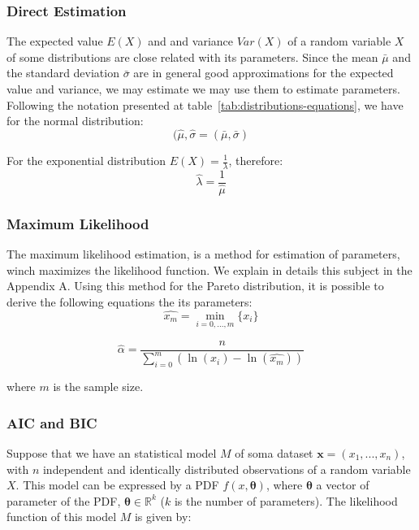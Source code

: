 \subsubsection{Direct Estimation}

The expected value $E(X)$ and and variance $Var(X)$ of a random variable $X$ of some distributions are close related with its parameters. Since the mean $\bar{\mu}$ and the standard deviation $\bar{\sigma}$ are in general good approximations for the expected value and variance, we may estimate we may use them to estimate parameters.
Following the notation presented at table~\ref{tab:distributions-equations}, we have for the normal distribution:
\begin{equation}
(\hat{\mu}, \hat{\sigma} = (\bar{\mu}, \bar{\sigma})
\end{equation}


For the exponential distribution $E(X) = \frac{1}{\lambda}$, therefore:
\begin{equation}
\hat{\lambda} = \frac{1}{\hat{\mu}}
\end{equation} 

\subsubsection{Maximum Likelihood}

The maximum likelihood estimation, is a method for estimation of parameters, winch maximizes the likelihood function. We explain in details this subject in the Appendix A. Using this method for the Pareto distribution, it is possible to derive the following equations the its parameters:
\begin{equation}
\hat{x_{m}} = \min_{i = 0, ..., m}\{x_{i}\}
\end{equation} 

\begin{equation}
\hat{\alpha} = \frac{n}{ \sum_{i = 0}^{m}(\ln{(x_{i}) - \ln(\hat{x_{m}})})  }
\end{equation} 

where $m$ is the sample size.


\subsubsection{AIC and BIC}

Suppose that we have an statistical model $M$ of soma dataset ${\boldsymbol{x} = (x_1, ..., x_n)}$, with $n$ independent and identically distributed observations of a random variable $X$. This model can be expressed by a PDF $f(x, \boldsymbol{\theta})$, where $\boldsymbol{\theta}$ a vector of parameter of the PDF, $\boldsymbol{\theta} \in \mathbb{R}^{k}$ ($k$ is the number of parameters). The  likelihood function  of this model $M$ is given by:


